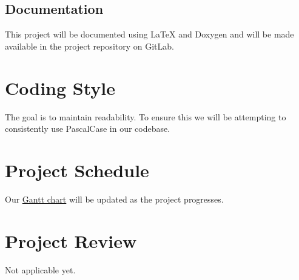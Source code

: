 \documentclass{article}
\begin{document}
	\subsection{Documentation}
	This project will be documented using LaTeX and Doxygen and will be made 
	available in the project repository on GitLab.
	
	\section{Coding Style}
	The goal is to maintain readability. To ensure this we will be 
	attempting to consistently use PascalCase in our codebase.
	
	\section{Project Schedule}
	
	Our 
	\href{https://gitlab.cas.mcmaster.ca/zacharin/wordle_clone_3xa3_l01_group8/-/tree/main/ProjectSchedule}{Gantt
		chart} will be updated as the project progresses.
	
	\section{Project Review}
	Not applicable yet.
	
\end{document}
